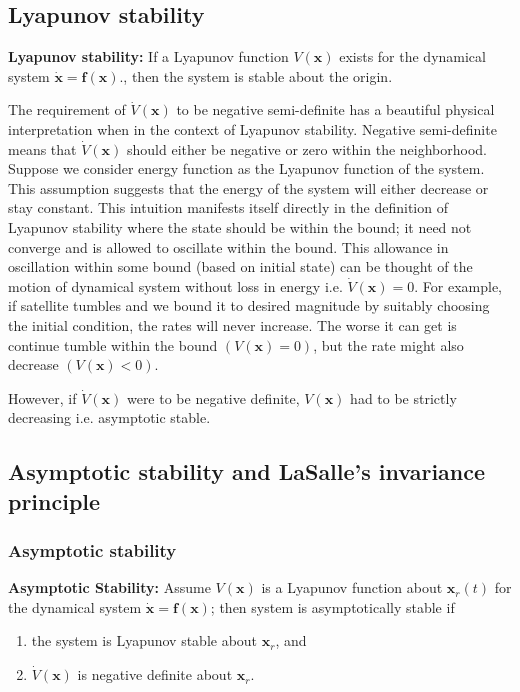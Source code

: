 \documentclass{article}
\begin{document}
\subsection{Lyapunov stability}
\textbf{Lyapunov stability:} If a Lyapunov function $V(\bm{x})$ exists for the dynamical system $\dot{\bm{x}} = \bm{f}(\bm{x})$., then the system is stable about the origin.

The requirement of $\dot{V}(\bm{x})$ to be negative semi-definite has a beautiful physical interpretation when in the context of Lyapunov stability. Negative semi-definite means that $\dot{V}(\bm{x})$ should either be negative or zero within the neighborhood. Suppose we consider energy function as the Lyapunov function of the system. This assumption suggests that the energy of the system will either decrease or stay constant. This intuition manifests itself directly in the definition of Lyapunov stability where the state should be within the bound; it need not converge and is allowed to oscillate within the bound. This allowance in oscillation within some bound (based on initial state) can be thought of the motion of dynamical system without loss in energy i.e. $\dot{V}(\bm{x})=0$. For example, if satellite tumbles and we bound it to desired magnitude by suitably choosing the initial condition, the rates will never increase. The worse it can get is continue tumble within the bound $(V(\bm{x}) = 0)$, but the rate might also decrease $(V(\bm{x})<0)$. 

However, if $\dot{V}(\bm{x})$ were to be negative definite, $V(\bm{x})$ had to be strictly decreasing i.e. asymptotic stable. 

\subsection{Asymptotic stability and LaSalle's invariance principle}
\subsubsection*{Asymptotic stability}
\textbf{Asymptotic Stability:} Assume $V(\bm{x})$ is a Lyapunov function about $\bm{x}_{r}(t)$ for the dynamical system $\dot{\bm{x}}=\bm{f}(\bm{x})$; then system is asymptotically stable if
\begin{enumerate}[noitemsep]
  \item the system is Lyapunov stable about $\bm{x}_{r}$, and
  \item $\dot{V}(\bm{x})$ is negative definite about $\bm{x}_{r}$.
\end{enumerate}
\end{document}

